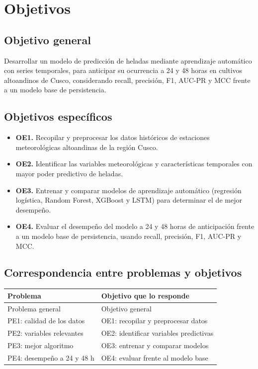 \section{Objetivos}
\label{sec:objetivos}

\subsection{Objetivo general}

Desarrollar un modelo de predicción de heladas mediante aprendizaje automático con series temporales, para anticipar su ocurrencia a 24 y 48 horas en cultivos altoandinos de Cusco, considerando recall, precisión, F1, AUC-PR y MCC frente a un modelo base de persistencia.
\subsection{Objetivos específicos}

\begin{itemize}
  \item \textbf{OE1.} Recopilar y preprocesar los datos históricos de estaciones meteorológicas altoandinas de la región Cusco.
  \item \textbf{OE2.} Identificar las variables meteorológicas y características temporales con mayor poder predictivo de heladas.
  \item \textbf{OE3.} Entrenar y comparar modelos de aprendizaje automático (regresión logística, Random Forest, XGBoost y LSTM) para determinar el de mejor desempeño.
  \item \textbf{OE4.} Evaluar el desempeño del modelo a 24 y 48 horas de anticipación frente a un modelo base de persistencia, usando recall, precisión, F1, AUC-PR y MCC.
\end{itemize}

\subsection{Correspondencia entre problemas y objetivos}

\begin{center}
\begin{tabular}{p{}p{}}
\toprule
\textbf{Problema} & \textbf{Objetivo que lo responde} \\
\midrule
Problema general & Objetivo general \\
PE1: calidad de los datos & OE1: recopilar y preprocesar datos \\
PE2: variables relevantes & OE2: identificar variables predictivas \\
PE3: mejor algoritmo & OE3: entrenar y comparar modelos \\
PE4: desempeño a 24 y 48 h & OE4: evaluar frente al modelo base \\
\bottomrule
\end{tabular}
\end{center}